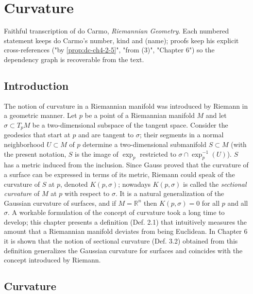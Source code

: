\chapter{Curvature}
\label{chap:dc-curvature}

Faithful transcription of do Carmo, \emph{Riemannian Geometry}. Each numbered
statement keeps do Carmo's number, kind and (name); proofs keep his explicit
cross-references ("by \cref{prop:dc-ch4-2-5}", "from (3)", "Chapter 6") so the
dependency graph is recoverable from the text.

\section{Introduction}

The notion of curvature in a Riemannian manifold was introduced by Riemann in a
geometric manner. Let $p$ be a point of a Riemannian manifold $M$ and let
$\sigma\subset T_pM$ be a two-dimensional subspace of the tangent space. Consider
the geodesics that start at $p$ and are tangent to $\sigma$; their segments in a
normal neighborhood $U\subset M$ of $p$ determine a two-dimensional submanifold
$S\subset M$ (with the present notation, $S$ is the image of $\exp_p$ restricted to
$\sigma\cap\exp_p^{-1}(U)$). $S$ has a metric induced from the inclusion. Since
Gauss proved that the curvature of a surface can be expressed in terms of its
metric, Riemann could speak of the curvature of $S$ at $p$, denoted $K(p,\sigma)$;
nowadays $K(p,\sigma)$ is called the \emph{sectional curvature} of $M$ at $p$ with
respect to $\sigma$. It is a natural generalization of the Gaussian curvature of
surfaces, and if $M=\mathbb{R}^n$ then $K(p,\sigma)=0$ for all $p$ and all
$\sigma$. A workable formulation of the concept of curvature took a long time to
develop; this chapter presents a definition (Def. 2.1) that intuitively measures
the amount that a Riemannian manifold deviates from being Euclidean. In Chapter 6
it is shown that the notion of sectional curvature (Def. 3.2) obtained from this
definition generalizes the Gaussian curvature for surfaces and coincides with the
concept introduced by Riemann.

\section{Curvature}

